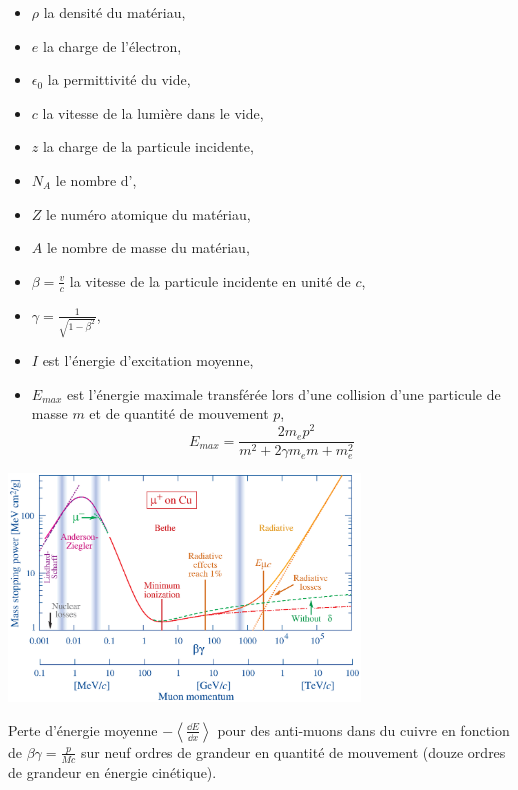 \begin{itemize}[label=$\bullet$]
	\item $\rho$ la densité du matériau,
	\item $e$ la charge de l'électron,
	\item $\epsilon_{0}$ la permittivité du vide,
	\item $c$ la vitesse de la lumière dans le vide,
	\item $z$ la charge de la particule incidente,
	\item $N_{A}$ le nombre d',
	\item $Z$ le numéro atomique du matériau,
	\item $A$ le nombre de masse du matériau,
	\item $\beta=\frac{v}{c}$ la vitesse de la particule incidente en unité de $c$,
	\item $\gamma=\frac{1}{\sqrt{1-\beta^{2}}}$,
	\item $I$ est l'énergie d'excitation moyenne,
	\item $E_{max}$ est l'énergie maximale transférée lors d'une collision d'une particule de masse $m$ et de quantité de mouvement $p$,
	\begin{equation}
	E_{max}=\frac{2m_{e}p^{2}}{m^2+2\gamma m_{e}m+m_{e}^2}
	\end{equation}
\end{itemize}

\begin{minipagewithmarginpars}[h]{0.95\textwidth}
	\centering
	\includegraphics[width=0.70\textwidth]{RPC/Bethe-Bloch.eps}
	\captionsetup{type=figure}\caption{Perte d'énergie moyenne $-\left<\frac{\dd E}{\dd x}\right>$ pour des anti-muons dans du cuivre en fonction de $\beta\gamma=\frac{p}{Mc}$ sur neuf ordres de grandeur en quantité de mouvement (douze ordres de grandeur en énergie cinétique)\cite{Olive:2016xmw}.}
	\label{Bethe-Block}
\end{minipagewithmarginpars}

